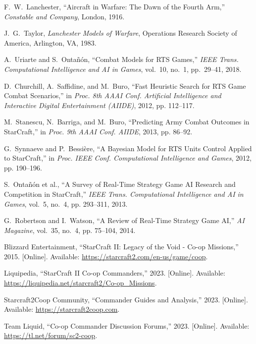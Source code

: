 \documentclass[a4paper,12pt]{article}
\begin{document}
\begin{thebibliography}{99}\small
{} F.~W.~Lanchester, ``Aircraft in Warfare: The Dawn of the Fourth Arm,'' \emph{Constable and Company}, London, 1916.

 J.~G.~Taylor, \emph{Lanchester Models of Warfare}, Operations Research Society of America, Arlington, VA, 1983.

 A.~Uriarte and S.~Ontañón, ``Combat Models for RTS Games,'' \emph{IEEE Trans. Computational Intelligence and AI in Games}, vol.~10, no.~1, pp.~29–41, 2018.

 D.~Churchill, A.~Saffidine, and M.~Buro, ``Fast Heuristic Search for RTS Game Combat Scenarios,'' in \emph{Proc. 8th AAAI Conf. Artificial Intelligence and Interactive Digital Entertainment (AIIDE)}, 2012, pp. 112–117.

 M.~Stanescu, N.~Barriga, and M.~Buro, ``Predicting Army Combat Outcomes in StarCraft,'' in \emph{Proc. 9th AAAI Conf. AIIDE}, 2013, pp. 86–92.

 G.~Synnaeve and P.~Bessière, ``A Bayesian Model for RTS Units Control Applied to StarCraft,'' in \emph{Proc. IEEE Conf. Computational Intelligence and Games}, 2012, pp. 190–196.

 S.~Ontañón et al., ``A Survey of Real-Time Strategy Game AI Research and Competition in StarCraft,'' \emph{IEEE Trans. Computational Intelligence and AI in Games}, vol.~5, no.~4, pp. 293–311, 2013.

 G.~Robertson and I.~Watson, ``A Review of Real-Time Strategy Game AI,'' \emph{AI Magazine}, vol.~35, no.~4, pp. 75–104, 2014.

 Blizzard Entertainment, ``StarCraft II: Legacy of the Void - Co-op Missions,'' 2015. [Online]. Available: \url{https://starcraft2.com/en-us/game/coop}.

 Liquipedia, ``StarCraft II Co-op Commanders,'' 2023. [Online]. Available: \url{https://liquipedia.net/starcraft2/Co-op_Missions}.

 Starcraft2Coop Community, ``Commander Guides and Analysis,'' 2023. [Online]. Available: \url{https://starcraft2coop.com}.

 Team Liquid, ``Co-op Commander Discussion Forums,'' 2023. [Online]. Available: \url{https://tl.net/forum/sc2-coop}.
\end{thebibliography}
\end{document}
